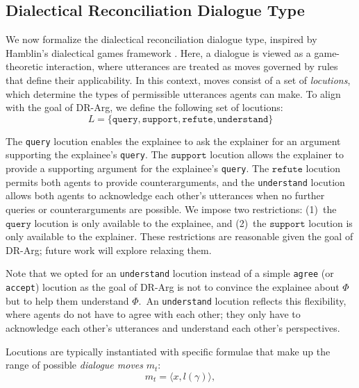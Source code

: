 \documentclass{article}
\begin{document}
\subsection{Dialectical Reconciliation Dialogue Type}

We now formalize the dialectical reconciliation dialogue type, inspired by Hamblin's dialectical games framework \citep{hamblin1970fallacies,hamblin1971mathematical}. Here, a dialogue is viewed as a game-theoretic interaction, where utterances are treated as moves governed by rules that define their applicability. In this context, moves consist of a set of \emph{locutions}, which determine the types of permissible utterances agents can make. To align with the goal of DR-Arg, we define the following set of locutions:
\begin{equation}
L = \{\texttt{query}, \texttt{support}, \texttt{refute}, \texttt{understand} \}
\end{equation}


The \texttt{query} locution enables the explainee to ask the explainer for an argument supporting the explainee's \texttt{query}. The $\texttt{support}$ locution allows the explainer to provide a supporting argument for the explainee's \texttt{query}. The $\texttt{refute}$ locution permits both agents to provide counterarguments, and the \texttt{understand} locution allows both agents to acknowledge each other's utterances when no further queries or counterarguments are possible. We impose two restrictions: (1)~the $\texttt{query}$ locution is only available to the explainee, and (2)~the $\texttt{support}$ locution is only available to the explainer. These restrictions are reasonable given the goal of DR-Arg; future work will explore relaxing them.

Note that we opted for an \texttt{understand} locution instead of a simple \texttt{agree} (or \texttt{accept}) locution as the goal of DR-Arg is not to convince the explainee about $\Phi$ but to help them understand $\Phi$.~An \texttt{understand} locution reflects this flexibility, where agents do not have to agree with each other; they only have to acknowledge each other's utterances and understand each other's perspectives. %


Locutions are typically instantiated with specific formulae that make up the range of possible \emph{dialogue moves} $m_t$:
\begin{equation}
m_t = \langle x, l(\gamma) \rangle,
\end{equation}
\end{document}
